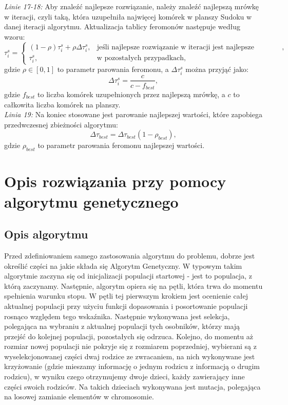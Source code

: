 \documentclass[11pt]{scrartcl} %
\begin{document}
\textit{Linie 17-18:} Aby znaleźć najlepsze rozwiązanie, należy znaleźć najlepszą mrówkę w iteracji, czyli taką, która uzupełniła najwięcej komórek w planszy Sudoku w danej iteracji algorytmu. Aktualizacja tablicy feromonów następuje według wzoru:
\begin{equation}
\tau_i^s = \begin{cases}
(1-\rho)\tau_i^s+\rho\Delta\tau_i^s, & \text{jeśli najlepsze rozwiązanie w iteracji jest najlepsze globalnie},\\
\tau_i^s, & \text{w pozostałych przypadkach,}
\end{cases}
\end{equation}
gdzie $\rho \in [0,1]$ to parametr parowania feromonu, a $\Delta\tau_i^s$ można przyjąć jako:
\begin{equation}
\Delta\tau_i^s = \dfrac{c}{c-f_{best}},
\end{equation}
gdzie $f_{best}$ to liczba komórek uzupełnionych przez najlepszą mrówkę, a $c$ to całkowita liczba komórek na planszy.\\

\textit{Linia 19:} Na koniec stosowane jest parowanie najlepszej wartości, które zapobiega przedwczesnej zbieżności algorytmu:
\begin{equation}
\Delta\tau_{best} = \Delta\tau_{best}(1-\rho_{best}),
\end{equation}
gdzie $\rho_{best}$ to parametr parowania feromonu najlepszej wartości.\\
\section{Opis rozwiązania przy pomocy algorytmu genetycznego}


\subsection{Opis algorytmu}

Przed zdefiniowaniem samego zastosowania algorytmu do problemu, dobrze jest określić części na jakie składa się Algorytm Genetyczny. W typowym takim algorytmie zaczyna się od inicjalizacji populacji startowej - jest to populacja, z którą zaczynamy. Następnie, algorytm opiera się na pętli, która trwa do momentu spełnienia warunku stopu. W pętli tej pierwszym krokiem jest ocenienie całej aktualnej populacji przy użyciu funkcji dopasowania i posortowanie populacji rosnąco względem tego wskaźnika. Następnie wykonywana jest selekcja, polegająca na wybraniu z aktualnej populacji tych osobników, którzy mają przejść do kolejnej populacji, pozostałych się odrzuca. Kolejno, do momentu aż rozmiar nowej populacji nie pokryje się z rozmiarem poprzedniej, wybierani są z wyselekcjonowanej części dwaj rodzice ze zwracaniem, na nich wykonywane jest krzyżowanie (gdzie mieszamy informację o jednym rodzicu z informacją o drugim rodzicu), w wyniku czego otrzymujemy dwoje dzieci, każdy zawierający inne części swoich rodziców. Na takich dzieciach wykonywana jest mutacja, polegająca na losowej zamianie elementów w chromosomie.\\
\end{document}
